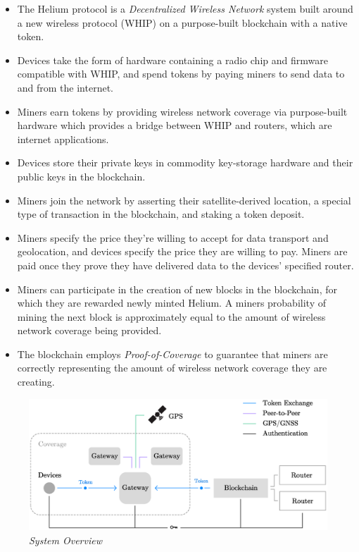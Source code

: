 \documentclass[letterpaper,11pt]{article}
\begin{document}
\begin{itemize}
    \item The Helium protocol is a \emph{Decentralized Wireless Network} system built around a new wireless protocol (WHIP) on a purpose-built blockchain with a native token.
    \item Devices take the form of hardware containing a radio chip and firmware compatible with WHIP, and spend tokens by paying miners to send data to and from the internet.
    \item Miners earn tokens by providing wireless network coverage via purpose-built hardware which provides a bridge between WHIP and routers, which are internet applications.
    \item Devices store their private keys in commodity key-storage hardware and their public keys in the blockchain.
    \item Miners join the network by asserting their satellite-derived location, a special type of transaction in the blockchain, and staking a token deposit.
    \item Miners specify the price they're willing to accept for data transport and geolocation, and devices specify the price they are willing to pay. Miners are paid once they prove they have delivered data to the devices' specified router.
    \item Miners can participate in the creation of new blocks in the blockchain, for which they are rewarded newly minted Helium. A miners probability of mining the next block is approximately equal to the amount of wireless network coverage being provided.
    \item The blockchain employs \emph{Proof-of-Coverage} to guarantee that miners are correctly representing the amount of wireless network coverage they are creating.
\end{itemize}

\begin{figure}[H]
    \begin{center}
          \includegraphics[width=\textwidth]{diagram1.eps}
          \caption{\emph{System Overview}}
          \label{fig:system}
     \end{center}
\end{figure}
\end{document}
